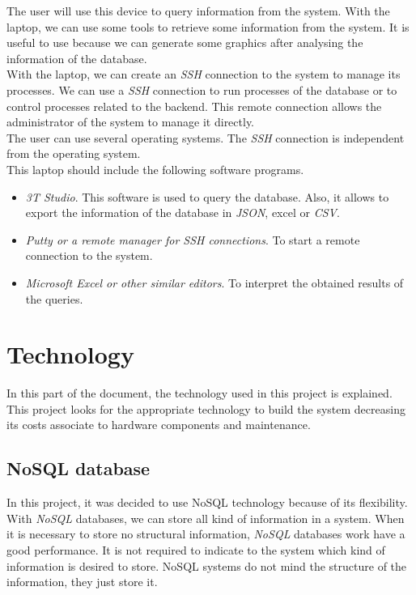 The user will use this device to query information from the system. With the laptop, we can use some tools to retrieve some information from the system. It is useful to use because we can generate some graphics after analysing the information of the database.\\

With the laptop, we can create an \textit{SSH} connection to the system to manage its processes. We can use a \textit{SSH} connection to run processes of the database or to control processes related to the backend. This remote connection allows the administrator of the system to manage it directly.\\

The user can use several operating systems. The \textit{SSH} connection is independent from the operating system. \\

This laptop should include the following software programs.

\begin{itemize}

\item \textit{3T Studio}. This software is used to query the database. Also, it allows to export the information of the database in \textit{JSON}, excel or \textit{CSV}.

\item \textit{Putty or a remote manager for SSH connections}. To start a remote connection to the system.

\item \textit{Microsoft Excel or other similar editors}. To interpret the obtained results of the queries.

\end{itemize}

\section{Technology}

In this part of the document, the technology used in this project is explained. This project looks for the appropriate technology to build the system decreasing its costs associate to hardware components and maintenance.

\subsection{NoSQL database}

In this project, it was decided to use NoSQL technology because of its flexibility. With \textit{NoSQL} databases, we can store all kind of information in a system. When it is necessary to store no structural information, \textit{NoSQL} databases work have a good performance. It is not required to indicate to the system which kind of information is desired to store. NoSQL systems do not mind the structure of the information, they just store it.\\


